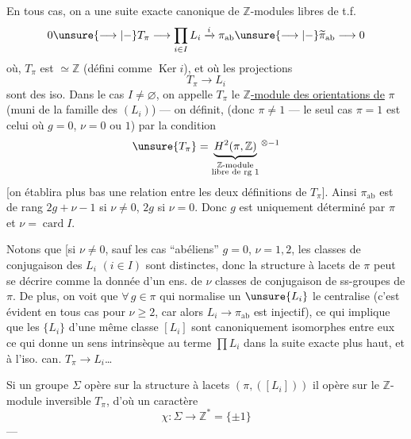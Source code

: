 En tous cas, on a une suite exacte
canonique de $\mathbb Z$-modules libres de t.f.
\[
0\unsure{\longrightarrow|-}T_\pi\longrightarrow\prod_{i\in I}L_i
\xrightarrow{i}\pi_{\mathrm{ab}}\unsure{\longrightarrow|-}\widetilde\pi_{\mathrm{ab}}\longrightarrow0
\]
où,  $T_\pi$ est $\simeq\mathbb Z$ (défini comme $\operatorname{Ker}i$), et où
les projections
\[
T_\pi\longrightarrow L_i
\]
sont des iso. Dans le cas $I\ne\varnothing$, on
appelle $T_\pi$ le \uline{$\mathbb Z$-module des orientations de}
$\pi$ (muni de la famille des $(L_i)$) ---
on définit,  
(donc $\pi\ne1$ --- le seul cas $\pi=1$ est celui où
$g=0$, $\nu=0$ ou $1$) par la condition
\[
\unsure{T_\pi}=\underbrace{H^2(\pi,\mathbb Z)}_{\substack{\mathbb Z\text{-module}\\\text{libre de rg }1}}{}^{\otimes-1}
\]
[on établira plus bas une relation entre les
deux définitions de $T_\pi$]. Ainsi $\pi_{\mathrm{ab}}$
est  de rang $2g+\nu-1$ si $\nu\ne0$, $2g$ si $\nu=0$.
Donc $g$ est uniquement déterminé par $\pi$ et $\nu=\operatorname{card}I$.



Notons que [si $\nu\ne0$, \inserted{et]} sauf les cas ``abéliens''
$g=0$, $\nu=1,2$, les classes de conjugaison
des $L_i$ $(i\in I)$ sont distinctes, donc la
structure à lacets de $\pi$ peut se décrire
comme la donnée d'un ens. de $\nu$ classes de
conjugaison de ss-groupes de $\pi$. De plus,
on voit que $\forall\,g\in\pi$ qui normalise
un $\unsure{L_i}$ le centralise (c'est évident
en tous cas pour $\nu\ge2$, car alors
$L_i\to\pi_{\mathrm{ab}}$ est injectif), ce qui implique
que les $\{L_i\}$ d'une même classe $[L_i]$
sont canoniquement isomorphes entre eux
ce qui donne un sens intrinsèque au
terme $\prod L_i$ dans la suite exacte
plus haut, et à l'iso. can. $T_\pi\to L_i$\dots
{}

Si un groupe $\Sigma$ opère sur la structure
à lacets $(\pi,([L_i]))$ il opère sur le
$\mathbb Z$-module inversible $T_\pi$, d'où un
caractère
\[
\chi:\Sigma\longrightarrow\mathbb Z^{*}=\{\pm1\}
\]
---

